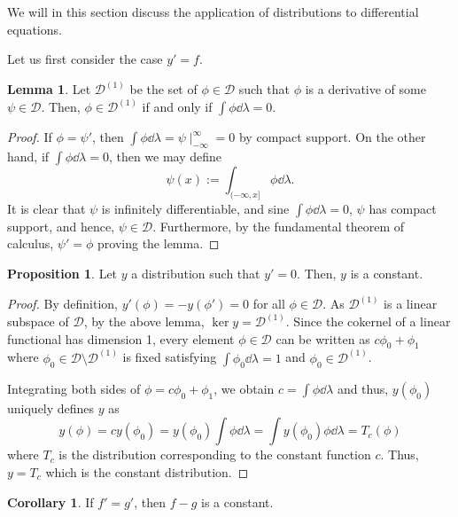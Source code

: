 \documentclass[]{article}
\theoremstyle{definition}
\newtheorem{corollary}{Corollary}[theorem]
\theoremstyle{definition}
\newtheorem{lemma}{Lemma}[section]
\newtheorem{proposition}{Proposition}[section]
\begin{document}
We will in this section discuss the application of distributions to differential 
equations.

Let us first consider the case \(y' = f\).

\begin{lemma}
  Let \(\mathcal{D}^{(1)}\) be the set of \(\phi \in \mathcal{D}\) such that 
  \(\phi\) is a derivative of some \(\psi \in \mathcal{D}\). Then, 
  \(\phi \in \mathcal{D}^{(1)}\) if and only if \(\int \phi \dd \lambda = 0\).
\end{lemma}
\begin{proof}
  If \(\phi = \psi'\), then \(\int \phi \dd \lambda = \psi\mid_{-\infty}^\infty = 0\)
  by compact support. On the other hand, if \(\int \phi \dd \lambda = 0\), then
  we may define 
  \[\psi(x) := \int_{(-\infty, x]} \phi \dd \lambda.\]
  It is clear that \(\psi\) is infinitely differentiable, and sine 
  \(\int \phi \dd \lambda = 0\), \(\psi\) has compact support, and hence, 
  \(\psi \in \mathcal{D}\). Furthermore, by the fundamental theorem of calculus, 
  \(\psi' = \phi\) proving the lemma.
\end{proof}

\begin{proposition}
  Let \(y\) a distribution such that \(y' = 0\). Then, \(y\) is a constant.
\end{proposition}
\begin{proof}
  By definition, \(y'(\phi) = -y(\phi') = 0\) for all \(\phi \in \mathcal{D}\).
  As \(\mathcal{D}^{(1)}\) is a linear subspace of \(\mathcal{D}\), by the 
  above lemma, \(\ker y = \mathcal{D}^{(1)}\). Since the cokernel of a linear 
  functional has dimension 1, every element \(\phi \in \mathcal{D}\) can be 
  written as \(c\phi_0 + \phi_1\) where \(\phi_0 \in \mathcal{D} \setminus 
  \mathcal{D}^{(1)}\) is fixed satisfying \(\int \phi_0 \dd \lambda = 1\) and
  \(\phi_0 \in \mathcal{D}^{(1)}\). 

  Integrating both sides of \(\phi = c\phi_0 + \phi_1\), we obtain
  \(c = \int \phi \dd \lambda\) and thus, \(y(\phi_0)\) uniquely defines 
  \(y\) as 
  \[y(\phi) = cy(\phi_0) = y(\phi_0) \int \phi \dd \lambda = 
    \int y(\phi_0)\phi \dd \lambda = T_c(\phi)\]
  where \(T_c\) is the distribution corresponding to the constant function \(c\).
  Thus, \(y = T_c\) which is the constant distribution.
\end{proof}

\begin{corollary}
  If \(f' = g'\), then \(f - g\) is a constant. 
\end{corollary}
\end{document}
